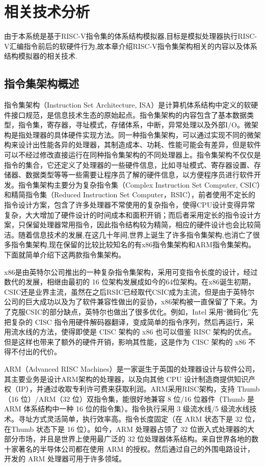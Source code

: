 
\chapter{相关技术分析}

由于本系统是基于RISC-V指令集的体系结构模拟器,目标是模拟处理器执行RISC-V汇编指令前后的软硬件行为,故本章介绍RISC-V指令集架构相关的内容以及体系结构模拟器的相关技术.

\section{指令集架构概述}

指令集架构（Instruction Set Architecture, ISA）是计算机体系结构中定义的软硬件接口规范，是信息技术生态的原始起点\cite{刘畅2021risc}。指令集架构的内容包含了基本数据类型，指令集，寄存器，寻址模式，存储体系，中断，异常处理以及外部I/O\cite{huweiwu}。微架构是指处理器的具体硬件实现方法。同一种指令集架构，可以通过实现不同的微架构来设计出性能各异的处理器，其制造成本、功耗、性能可能会有差异，但是软件可以不经过修改直接运行在同种指令集架构的不同处理器上。指令集架构不仅仅是指令的集合，它还定义了处理器的一些硬件信息，比如寻址模式、寄存器设置、存储器、数据类型等等一些需要让程序员了解的硬件信息，以方便程序员进行软件开发。指令集架构主要分为复杂指令集（Complex Instruction Set Computer, CSIC）和精简指令集（Reduced Instruction Set Computer，RSIC），前者使用不定长的指令设计方案，包含了许多处理器不常使用的复杂指令，使得CPU设计变得异常复杂，大大增加了硬件设计的时间成本和面积开销；而后者采用定长的指令设计方案，只保留处理器常用指令，因此指令结构较为精简，相应的硬件设计也会比较简洁。随着信息技术的发展,在这几十年间,世界上诞生了许多指令集架构,也消亡了很多指令集架构,现在保留的比较比较知名的有x86指令集架构和ARM指令集架构。下面就简单介绍下这两款指令集架构。


x86是由英特尔公司推出的一种复杂指令集架构，采用可变指令长度的设计，经过数代的发展，相继由最初的 16 位架构发展成如今的64位架构。在x86诞生初期，CSIC还是业界主流，虽然在之后RSIC已经取代CSIC成为主流，但是由于英特尔公司的巨大成功以及为了软件兼容性做出的妥协，x86架构被一直保留了下来。为了克服CSIC的部分缺点，英特尔也做出了很多优化。例如，Intel 采用“微码化”先把复杂的 CISC 指令用硬件解码器翻译，变成简单的指令序列，然后再运行，采用流水线的方法，使得即使是 CISC 架构的 x86 也可以借鉴 RISC 架构的优点。但是这样也带来了额外的硬件开销，影响其性能，这是作为 CISC 架构的 x86 不得不付出的代价。


ARM（Advanced RISC Machines）是一家诞生于英国的处理器设计与软件公司，其主要业务是设计ARM架构的处理器，以及向其他 CPU 设计制造商提供知识产权（IP），并通过收取专利许可费来获取利润。ARM采用RISC架构，支持 Thumb（16 位）/ARM（32 位）双指令集，能很好地兼容 8 位/16 位器件（Thumb 是 ARM 体系结构中一种 16 位的指令集）。指令执行采用 3 级流水线/5 级流水线技术。寻址方式灵活简单，执行效率高。指令长度固定（在 ARM 状态下是 32 位，在Thumb 状态下是 16 位）。如今，ARM 处理器占领了 32 位嵌入式处理器的大部分市场，并且是世界上使用最广泛的 32 位处理器体系结构。来自世界各地的数十家著名的半导体公司都在使用 ARM 的授权。然后通过自己的外围电路设计，开发的 ARM 处理器可用于许多领域。

